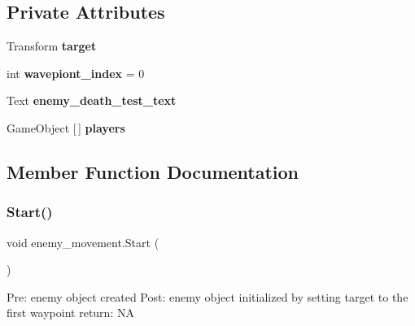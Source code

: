 \subsection*{Private Attributes}
\begin{DoxyCompactItemize}
\item 
\mbox{\label{classenemy__movement_a21eb53aeae43e83264e5a567dae3382b}} 
Transform {\bfseries target}
\item 
\mbox{\label{classenemy__movement_aeb8340df38b3b6e8d8974fd3ddc1de07}} 
int {\bfseries wavepiont\+\_\+index} = 0
\item 
\mbox{\label{classenemy__movement_a5040f773cb0da2de57c204fae8f8d37d}} 
Text {\bfseries enemy\+\_\+death\+\_\+test\+\_\+text}
\item 
\mbox{\label{classenemy__movement_ac9c8c31e0c99bad28b5d788a165ed40c}} 
Game\+Object \mbox{[}$\,$\mbox{]} {\bfseries players}
\end{DoxyCompactItemize}


\subsection{Member Function Documentation}
\mbox{\label{classenemy__movement_a6f78b4e6952786e1ee8d7063b4c59dba}} 
\subsubsection{\texorpdfstring{Start()}{Start()}}
{\footnotesize\ttfamily void enemy\+\_\+movement.\+Start (\begin{DoxyParamCaption}{ }\end{DoxyParamCaption})\hspace{0.3cm}{\ttfamily [private]}}

Pre\+: enemy object created Post\+: enemy object initialized by setting target to the first waypoint return\+: NA \mbox{\label{classenemy__movement_a6937591e8d99aec470f81199b0850967}} 
